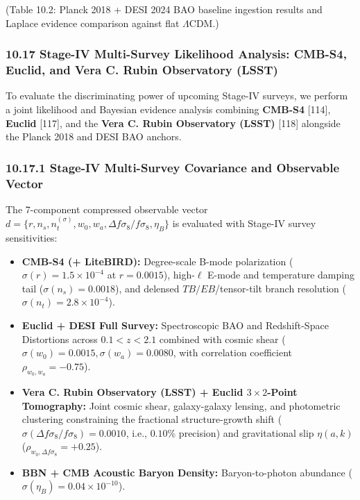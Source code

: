 \documentclass[aps,prd,onecolumn,superscriptaddress,nofootinbib,longbibliography,10pt]{revtex4-2}
\begin{document}
  (Table 10.2: Planck 2018 + DESI 2024 BAO baseline ingestion results and Laplace evidence comparison against flat $\Lambda$CDM.) 



  
\subsubsection*{10.17 Stage-IV Multi-Survey Likelihood Analysis: CMB-S4, Euclid, and Vera C. Rubin Observatory (LSST)}

  To evaluate the discriminating power of upcoming Stage-IV surveys, we perform a joint likelihood and Bayesian evidence analysis combining \textbf{CMB-S4} [114], \textbf{Euclid} [117], and the \textbf{Vera C. Rubin Observatory (LSST)} [118] alongside the Planck 2018 and DESI BAO anchors.


  
\subsubsection*{10.17.1 Stage-IV Multi-Survey Covariance and Observable Vector}

  The 7-component compressed observable vector \(d = \{r, n_s, n_t^{(\sigma)}, w_0, w_a, \Delta f\sigma_8/f\sigma_8, \eta_B\}\) is evaluated with Stage-IV survey sensitivities:


  
\begin{itemize}
    
\item \textbf{CMB-S4 (+ LiteBIRD):} Degree-scale B-mode polarization (\(\sigma(r) = 1.5 \times 10^{-4}\) at \(r = 0.0015\)), high-\(\ell\) E-mode and temperature damping tail (\(\sigma(n_s) = 0.0018\)), and delensed \(TB/EB\)/tensor-tilt branch resolution (\(\sigma(n_t) = 2.8 \times 10^{-4}\)).
    
\item \textbf{Euclid + DESI Full Survey:} Spectroscopic BAO and Redshift-Space Distortions across \(0.1 < z < 2.1\) combined with cosmic shear (\(\sigma(w_0) = 0.0015, \sigma(w_a) = 0.0080\), with correlation coefficient \(\rho_{w_0, w_a} = -0.75\)).
    
\item \textbf{Vera C. Rubin Observatory (LSST) + Euclid \(3 \times 2\)-Point Tomography:} Joint cosmic shear, galaxy-galaxy lensing, and photometric clustering constraining the fractional structure-growth shift (\(\sigma(\Delta f\sigma_8/f\sigma_8) = 0.0010\), i.e., \(0.10\%\) precision) and gravitational slip \(\eta(a,k)\) (\(\rho_{w_0, \Delta f\sigma_8} = +0.25\)).
    
\item \textbf{BBN + CMB Acoustic Baryon Density:} Baryon-to-photon abundance (\(\sigma(\eta_B) = 0.04 \times 10^{-10}\)).
  
\end{itemize}
\end{document}
